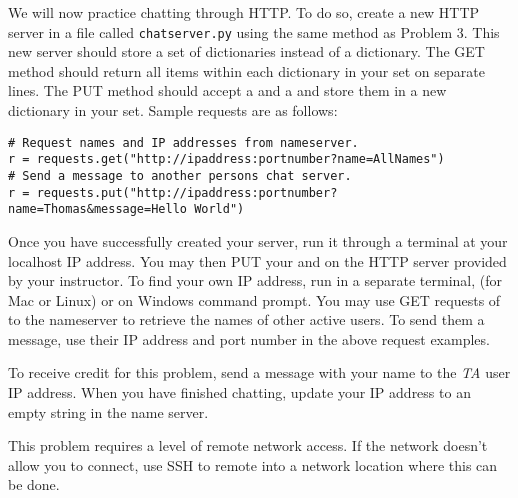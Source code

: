 \begin{problem}
We will now practice chatting through HTTP.
To do so, create a new HTTP server in a file called \texttt{chatserver.py} using the same method as Problem 3. %
This new server should store a set of dictionaries instead of a  dictionary.
The GET method should return all items within each dictionary in your set on separate lines.
The PUT method should accept a  and a  and store them in a new dictionary in your set.
Sample requests are as follows:

\begin{lstlisting}
# Request names and IP addresses from nameserver.
r = requests.get("http://ipaddress:portnumber?name=AllNames")
# Send a message to another persons chat server.
r = requests.put("http://ipaddress:portnumber?name=Thomas&message=Hello World")
\end{lstlisting}

Once you have successfully created your server, run it through a terminal at your localhost IP address.
You may then PUT your  and  on the HTTP server provided by your instructor.
To find your own IP address, run in a separate terminal,  (for Mac or Linux) or  on Windows command prompt.
You may use GET requests of  to the nameserver to retrieve the names of other active users.
To send them a message, use their IP address and port number in the above request examples.

To receive credit for this problem, send a message with your name to the \emph{TA} user IP address.
When you have finished chatting, update your IP address to an empty string in the name server.

\begin{warn}
This problem requires a level of remote network access. If the network doesn't allow you to connect, use SSH to remote into a network location where this can be done.
\end{warn}
\end{problem}
